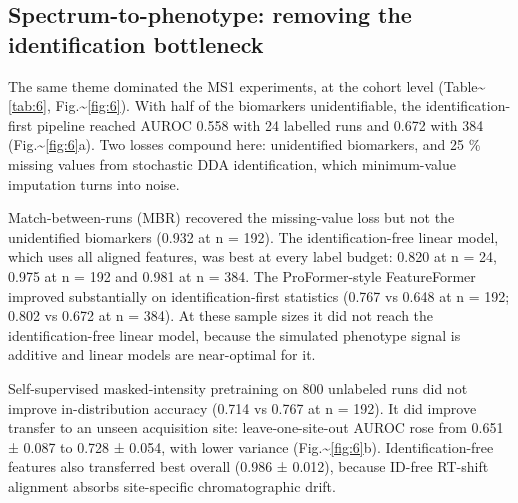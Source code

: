 \documentclass{sn-preview}
\begin{document}
\subsection{Spectrum-to-phenotype: removing the identification bottleneck}

The same theme dominated the MS1 experiments, at the cohort level (Table\textasciitilde{}\ref{tab:6}, Fig.\textasciitilde{}\ref{fig:6}). With half of the biomarkers unidentifiable, the identification-first pipeline reached AUROC 0.558 with 24 labelled runs and 0.672 with 384 (Fig.\textasciitilde{}\ref{fig:6}a). Two losses compound here: unidentified biomarkers, and 25 \% missing values from stochastic DDA identification, which minimum-value imputation turns into noise.

Match-between-runs (MBR) recovered the missing-value loss but not the unidentified biomarkers (0.932 at n = 192). The identification-free linear model, which uses all aligned features, was best at every label budget: 0.820 at n = 24, 0.975 at n = 192 and 0.981 at n = 384. The ProFormer-style FeatureFormer improved substantially on identification-first statistics (0.767 vs 0.648 at n = 192; 0.802 vs 0.672 at n = 384). At these sample sizes it did not reach the identification-free linear model, because the simulated phenotype signal is additive and linear models are near-optimal for it.

Self-supervised masked-intensity pretraining on 800 unlabeled runs did not improve in-distribution accuracy (0.714 vs 0.767 at n = 192). It did improve transfer to an unseen acquisition site: leave-one-site-out AUROC rose from 0.651 ± 0.087 to 0.728 ± 0.054, with lower variance (Fig.\textasciitilde{}\ref{fig:6}b). Identification-free features also transferred best overall (0.986 ± 0.012), because ID-free RT-shift alignment absorbs site-specific chromatographic drift.
\end{document}
